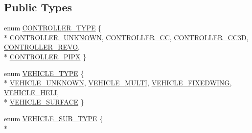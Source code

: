 \subsection*{Public Types}
\begin{DoxyCompactItemize}
\item 
enum \hyperlink{group___vehicle_configuration_source_ga3cfce2b0a501a6fdb7a0ae408ba63556}{C\-O\-N\-T\-R\-O\-L\-L\-E\-R\-\_\-\-T\-Y\-P\-E} \{ \\*
\hyperlink{group___vehicle_configuration_source_gga3cfce2b0a501a6fdb7a0ae408ba63556a69e31dc8fafebcdb8981dff697239dd4}{C\-O\-N\-T\-R\-O\-L\-L\-E\-R\-\_\-\-U\-N\-K\-N\-O\-W\-N}, 
\hyperlink{group___vehicle_configuration_source_gga3cfce2b0a501a6fdb7a0ae408ba63556ac8cfc9f4873ebb35df9f159f5cd64a70}{C\-O\-N\-T\-R\-O\-L\-L\-E\-R\-\_\-\-C\-C}, 
\hyperlink{group___vehicle_configuration_source_gga3cfce2b0a501a6fdb7a0ae408ba63556a5181ce709fafc7492ecc4435b8d1b225}{C\-O\-N\-T\-R\-O\-L\-L\-E\-R\-\_\-\-C\-C3\-D}, 
\hyperlink{group___vehicle_configuration_source_gga3cfce2b0a501a6fdb7a0ae408ba63556ab492640b9dd702541686984714e89af3}{C\-O\-N\-T\-R\-O\-L\-L\-E\-R\-\_\-\-R\-E\-V\-O}, 
\\*
\hyperlink{group___vehicle_configuration_source_gga3cfce2b0a501a6fdb7a0ae408ba63556a00ab0b6a83c903dd05c865b3659b2ae4}{C\-O\-N\-T\-R\-O\-L\-L\-E\-R\-\_\-\-P\-I\-P\-X}
 \}
\item 
enum \hyperlink{group___vehicle_configuration_source_gaa97253587c69ba0d23535abdc42fad43}{V\-E\-H\-I\-C\-L\-E\-\_\-\-T\-Y\-P\-E} \{ \\*
\hyperlink{group___vehicle_configuration_source_ggaa97253587c69ba0d23535abdc42fad43a7323fb577948d82afe9c95ab8811a997}{V\-E\-H\-I\-C\-L\-E\-\_\-\-U\-N\-K\-N\-O\-W\-N}, 
\hyperlink{group___vehicle_configuration_source_ggaa97253587c69ba0d23535abdc42fad43a70465cb26d67210d6a391ae6c57a3742}{V\-E\-H\-I\-C\-L\-E\-\_\-\-M\-U\-L\-T\-I}, 
\hyperlink{group___vehicle_configuration_source_ggaa97253587c69ba0d23535abdc42fad43a0ee07742ddd4e5c2ebb94c0c533fa076}{V\-E\-H\-I\-C\-L\-E\-\_\-\-F\-I\-X\-E\-D\-W\-I\-N\-G}, 
\hyperlink{group___vehicle_configuration_source_ggaa97253587c69ba0d23535abdc42fad43a87b79ad838ea0994916b11e3f5334561}{V\-E\-H\-I\-C\-L\-E\-\_\-\-H\-E\-L\-I}, 
\\*
\hyperlink{group___vehicle_configuration_source_ggaa97253587c69ba0d23535abdc42fad43a669dadf2a2dceaaee6a2365c7562b946}{V\-E\-H\-I\-C\-L\-E\-\_\-\-S\-U\-R\-F\-A\-C\-E}
 \}
\item 
enum \hyperlink{group___vehicle_configuration_source_gaa22bfa88d750f2b46f66702a723e8342}{V\-E\-H\-I\-C\-L\-E\-\_\-\-S\-U\-B\-\_\-\-T\-Y\-P\-E} \{ \\*

\end{DoxyCompactItemize}
